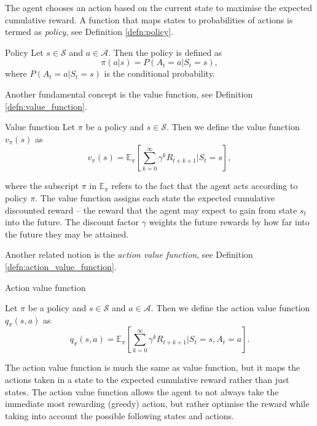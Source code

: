 The agent chooses an action based on the current state to maximise the expected cumulative reward. A function that maps states to probabilities of actions is termed as \textit{policy}, see Definition \ref{defn:policy}.

\begin{defn}{Policy} \cite[Section 3.5]{sutton2018reinforcement}
\label{defn:policy}
Let $s \in \mathcal{S}$ and $a \in \mathcal{A}$. Then the policy is defined as
\begin{equation}
\pi(a|s)=P(A_t=a|S_t=s),
\end{equation}
where $P(A_t=a|S_t=s)$ is the conditional probability.
\end{defn} 

Another fundamental concept is the value function, see Definition \ref{defn:value_function}.

\begin{defn}{Value function} \cite[Section 3.5]{sutton2018reinforcement}
\label{defn:value_function}
Let $\pi$ be a policy and $s \in \mathcal{S}$. Then we define the value function $v_{\pi}(s)$ as
\begin{equation}
v_{\pi}(s)=\mathbb{E}_{\pi} \left[ \sum_{k=0}^{\infty} \gamma^k R_{t+k+1} | S_t=s \right],
\end{equation}
\end{defn}
where the subscript $\pi$ in $\mathbb{E}_{\pi}$ refers to the fact that the agent acts according to policy $\pi$.
The value function assigns each state the expected cumulative discounted reward -- the reward that the agent may expect to gain from state $s_t$ into the future. The discount factor $\gamma$ weights the future rewards by how far into the future they may be attained.

Another related notion is the \textit{action value function}, see Definition \ref{defn:action_value_function}.

\begin{defn}{Action value function} \cite[Section 3.5]{sutton2018reinforcement}
\label{defn:action_value_function}

Let $\pi$ be a policy and $s \in \mathcal{S}$ and $a \in \mathcal{A}$. Then we define the action value function $q_{\pi}(s,a)$ as
\begin{equation}
 q_{\pi}(s,a)=\mathbb{E}_{\pi} \left[ \sum_{k=0}^{\infty} \gamma^k R_{t+k+1} | S_t=s, A_t=a \right].
\end{equation}
\end{defn}
The action value function is much the same as value function, but it maps the actions taken in a state to the expected cumulative reward rather than just states. The action value function allows the agent to not always take the immediate most rewarding (greedy) action, but rather optimise the reward while taking into account the possible following states and actions. 

